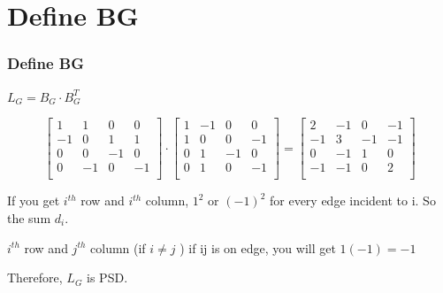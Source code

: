 \documentclass{beamer}
\begin{document}
\section{Define BG}
\begin{frame}
\frametitle{\textbf{Define BG} }

$L_{G} = B_{G} \cdot B_{G}^{T}$


\begin{equation*}
    \left\lbrack\begin{array}{cccc}
        1  & 1  & 0  & 0  \\
        -1 & 0  & 1  & 1  \\
        0  & 0  & -1 & 0  \\
        0  & -1 & 0  & -1 \\
    \end{array}\right\rbrack
    \cdot
    \left\lbrack\begin{array}{cccc}
        1 & -1 & 0  & 0  \\
        1 &  0 & 0  & -1  \\
        0 &  1 & -1 & 0  \\
        0 &  1 & 0  & -1 \\
    \end{array}\right\rbrack
    =
    \left\lbrack\begin{array}{cccc}
        2  & -1 & 0  & -1 \\
        -1 &  3 & -1 & -1 \\
        0  & -1 & 1  & 0  \\
        -1 & -1 & 0  & 2  \\
    \end{array}\right\rbrack
\end{equation*}

If you get $i^{th}$ row and $i^{th}$ column, $1^2$ or $(-1)^2$ for every edge incident to i. So the sum $d_{i}$.

$i^{th}$ row and $j^{th}$ column (if $i \neq j$ ) if ij is on edge, you will get $1(-1) = -1$

Therefore, $L_{G}$ is PSD.



\end{frame}
\end{document}
